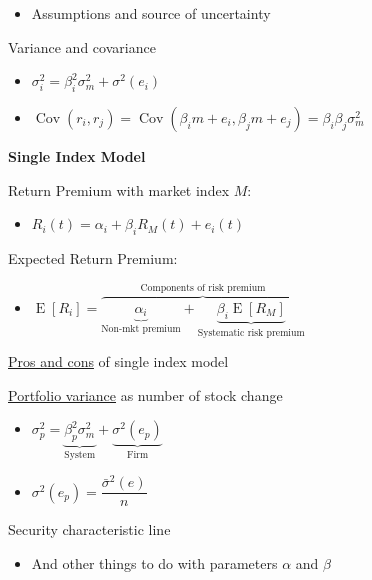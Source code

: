 \documentclass[]{book}
\providecommand{\tightlist}{%
  \setlength{\itemsep}{0pt}\setlength{\parskip}{0pt}}
\theoremstyle{definition}
\theoremstyle{definition}
\theoremstyle{remark}
\begin{document}
\begin{itemize}
\tightlist
\item
  Assumptions and source of uncertainty
\end{itemize}

Variance and covariance

\begin{itemize}
\item
  \(\sigma^2_i = \beta^2_i \sigma^2_m + \sigma^2(e_i)\)
\item
  \(\operatorname{Cov}(r_i, r_j) = \operatorname{Cov}(\beta_i m + e_i, \beta_j m + e_j) = \beta_i \beta_j \sigma^2_m\)
\end{itemize}

\textbf{Single Index Model}

Return Premium with market index \(M\):

\begin{itemize}
\tightlist
\item
  \(R_i(t) = \alpha_i + \beta_i R_M(t) + e_i(t)\)
\end{itemize}

Expected Return Premium:

\begin{itemize}
\tightlist
\item
  \(\operatorname{E}[R_i] = \overbrace{\underbrace{\alpha_i}_{\text{Non-mkt premium}} + \underbrace{\beta_i \operatorname{E}[R_M]}_{\text{Systematic risk premium}}}^{\text{Components of risk premium}}\)
\end{itemize}

\protect\hyperlink{single-index-pros-cons}{Pros and cons} of single
index model

\protect\hyperlink{firm-spec-risk}{Portfolio variance} as number of
stock change

\begin{itemize}
\item
  \(\sigma^2_p = \underbrace{\beta^2_p \sigma^2_m}_{\text{System}} + \underbrace{\sigma^2(e_p)}_{\text{Firm}}\)
\item
  \(\sigma^2(e_p) = \dfrac{\bar{\sigma}^2(e)}{n}\)
\end{itemize}

Security characteristic line

\begin{itemize}
\tightlist
\item
  And other things to do with parameters \(\alpha\) and \(\beta\)
\end{itemize}
\end{document}
